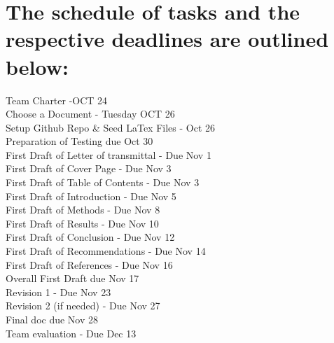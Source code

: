 \documentclass[12pt,A4paper]{article}
\begin{document}
\section{The schedule of tasks and the respective deadlines are outlined below:}
	\small
	Team Charter -OCT 24 \\
	Choose a Document - Tuesday OCT 26 \\
	Setup Github Repo \& Seed LaTex Files - Oct 26 \\
	Preparation of Testing due Oct 30 \\
	First Draft of Letter of transmittal - Due Nov 1 \\
	First Draft of Cover Page - Due Nov 3 \\
	First Draft of Table of Contents - Due Nov 3 \\
	First Draft of Introduction - Due Nov 5 \\
	First Draft of Methods - Due Nov 8 \\
	First Draft of Results - Due Nov 10 \\
	First Draft of Conclusion - Due Nov 12 \\
	First Draft of Recommendations - Due Nov 14 \\
	First Draft of References - Due Nov 16 \\
	Overall First Draft due Nov 17 \\
	Revision 1 - Due Nov 23 \\
	Revision 2 (if needed) - Due Nov 27 \\
	Final doc due Nov 28 \\
	Team evaluation - Due Dec 13 \\
\end{document}
